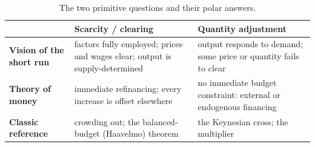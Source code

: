 \begin{table}[htbp]
\centering
\small
\begin{tabular}{@{}p{3.0cm} p{4.4cm} p{4.4cm}@{}}
\toprule
 & \textbf{Scarcity / clearing} & \textbf{Quantity adjustment} \\
\midrule
\textbf{Vision of the short run}
  & factors fully employed; prices and wages clear; output is
    supply-determined
  & output responds to demand; some price or quantity fails to clear \\[2pt]
\textbf{Theory of money}
  & immediate refinancing: every increase is offset elsewhere
  & no immediate budget constraint: external or endogenous financing \\[2pt]
\textbf{Classic reference}
  & crowding out; the balanced-budget (Haavelmo) theorem
  & the Keynesian cross; the multiplier \\
\bottomrule
\end{tabular}
\caption{The two primitive questions and their polar answers.}
\label{tab:two-questions}
\end{table}
